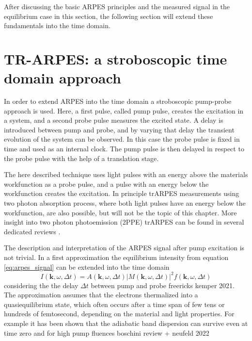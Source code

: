 After discussing the basic ARPES principles and the measured signal in the equilibrium case in this section, the following section will extend these fundamentals into the time domain.

\section{TR-ARPES: a stroboscopic time domain approach}

In order to extend ARPES into the time domain a stroboscopic pump-probe approach is used.
Here, a first pulse, called pump pulse, creates the excitation in a system, and a second probe pulse measures the excited state.
A delay is introduced between pump and probe, and by varying that delay the transient evolution of the system can be observed.
In this case the probe pulse is fixed in time and used as an internal clock.
The pump pulse is then delayed in respect to the probe pulse with the help of a translation stage.

The here described technique uses light pulses with an energy above the materials workfunction as a probe pulse, and a pulse with an energy below the workfunction creates the excitation.
In principle trARPES measurements using two photon absorption process, where both light pulses have an energy below the workfunction, are also possible, but will not be the topic of this chapter.
More insight into two photon photoemission (2PPE) trARPES can be found in several dedicated reviews \cite{}.

The description and interpretation of the ARPES signal after pump excitation is not trivial.
In a first approximation the equilibrium intensity from equation \ref{eq:arpes_signal} can be extended into the time domain
\begin{equation}
	I(\mathbf{k}, \omega, \Delta t) = A(\mathbf{k}, \omega, \Delta t)\left|M(\mathbf{k}, \omega, \Delta t)\right|^2f(\mathbf{k}, \omega, \Delta t)
\end{equation}
considering the the delay  $\Delta t$ between pump and probe \cite{} freericks kemper 2021.
The approximation assumes that the electrons thermalized into a quasiequilibrium state, which often occurs after a time span of few tens or hundreds of femtosecond, depending on the material and light properties.
For example it has been shown that the adiabatic band dispersion can survive even at time zero and for high pump fluences \cite{} boschini review + neufeld 2022

